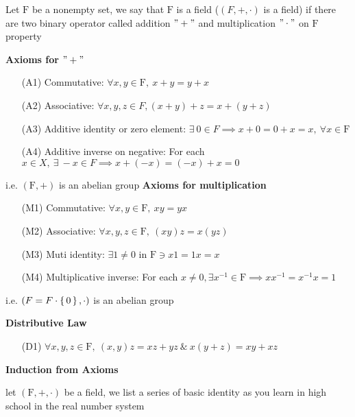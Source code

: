 \begin{defn}
	Let $\mathrm{F}$ be a nonempty set, we say that $\mathrm{F}$ is a field ($(F,+,\cdot)$ is a field) if there are two binary operator called addition $"+"$ and multiplication $"\cdot"$ on $\mathrm{F}$ property
	
	\begin{tcolorbox}
		\textbf{Axioms for $"+"$}
		\begin{enumerate}
			\item[(A1)] Commutative: $\forall x,y \in \mathrm{F},~x+y=y+x$
			\item[(A2)] Associative: $\forall x,y,z \in F, (x+y)+z = x+(y+z)$
			\item[(A3)] Additive identity or zero element: $\exists~ 0 \in F \implies x + 0 = 0 + x = x ,~\forall x \in \mathrm{F}$
			\item[(A4)] Additive inverse on negative: For each $x \in X,~ \exists~-x \in F \implies x + (-x) = (-x) + x = 0$
		\end{enumerate}
		i.e. $(\mathrm{F},+)$ is an abelian group
		\textbf{Axioms for multiplication}
		\begin{enumerate}
			\item[(M1)] Commutative: $\forall x,y \in \mathrm{F},~xy=yx$
			\item[(M2)] Associative: $\forall x,y,z \in \mathrm{F},~(xy)z = x(yz)$
			\item[(M3)] Muti identity: $\exists 1 \neq 0$ in $\mathrm{F} \ni x1 = 1x = x$
			\item[(M4)] Multiplicative inverse: For each $x \neq 0, \exists x^{-1} \in \mathrm{F} \implies xx^{-1} = x^{-1}x = 1$
		\end{enumerate}
		i.e. $(F = F\cdot \left\{ \,0 \,\right\},\cdot)$ is an abelian group
	
		\textbf{Distributive Law}
		\begin{enumerate}
			\item[(D1)] $\forall x,y,z \in \mathrm{F},~(x,y)z = xz+yz ~\&~ x(y+z) = xy+xz$
		\end{enumerate}
	\end{tcolorbox}
	
	
	
	
\end{defn}

\textbf{Induction from Axioms}

let $(\mathrm{F},+,\cdot)$ be a field, we list a series of basic identity as you learn in high school in the real number system

\newpage

